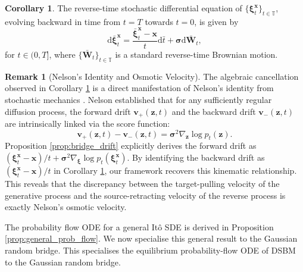 \documentclass{article}
\def\T{\mathbb{T}}
\theoremstyle{definition}
\newtheorem{corollary}[proposition]{Corollary}
\newtheorem{remark}[proposition]{Remark}
\begin{document}
\begin{corollary} \label{cor:reverse_sde}
    The reverse-time stochastic differential equation of $\{\boldsymbol{\xi}^{\boldsymbol{x}}_t\}_{t \in \mathbb{T}}$, evolving backward in time from $t=T$ towards $t=0$, is given by
    \begin{equation*}
        \mathrm{d}\bar{\boldsymbol{\xi}}^{\boldsymbol{x}}_t = \frac{\bar{\boldsymbol{\xi}}^{\boldsymbol{x}}_t - \boldsymbol{x}}{t} \mathrm{d}\bar{t} + \boldsymbol{\sigma} \mathrm{d}\bar{\mathbf{W}}_t,
    \end{equation*}
    for $t\in(0,T]$, where $\{\bar{\mathbf{W}}_t\}_{t\in\T}$ is a standard reverse-time Brownian motion.
\end{corollary}
\begin{remark}[Nelson's Identity and Osmotic Velocity]
The algebraic cancellation observed in Corollary \ref{cor:reverse_sde} is a direct manifestation of Nelson's identity from stochastic mechanics \cite[Chapter 13]{nelson_dynamical_1967}. Nelson established that for any sufficiently regular diffusion process, the forward drift $\boldsymbol{v}_+(\boldsymbol{z}, t)$ and the backward drift $\boldsymbol{v}_-(\boldsymbol{z}, t)$ are intrinsically linked via the score function:
\begin{equation*}
    \boldsymbol{v}_+(\boldsymbol{z}, t) - \boldsymbol{v}_-(\boldsymbol{z}, t) = \boldsymbol{\sigma}^2 \nabla_{\boldsymbol{z}} \log p_t(\boldsymbol{z}).
\end{equation*}
Proposition \ref{prop:bridge_drift} explicitly derives the forward drift as $(\boldsymbol{\xi}^{\boldsymbol{x}}_t - \boldsymbol{x})/t + \boldsymbol{\sigma}^2 \nabla_{\boldsymbol{\xi}} \log p_t(\boldsymbol{\xi}^{\boldsymbol{x}}_t)$. By identifying the backward drift as $(\boldsymbol{\xi}^{\boldsymbol{x}}_t - \boldsymbol{x})/t$ in Corollary \ref{cor:reverse_sde}, our framework recovers this kinematic relationship. This reveals that the discrepancy between the target-pulling velocity of the generative process and the source-retracting velocity of the reverse process is exactly Nelson's osmotic velocity. %
\end{remark}

The probability flow ODE for a general It\^{o} SDE is derived in Proposition \ref{prop:general_prob_flow}. We now specialise this general result to the Gaussian random bridge. This specialises the equilibrium probability-flow ODE of DSBM \cite{shi2023diffusion} to the Gaussian random bridge.
\end{document}
